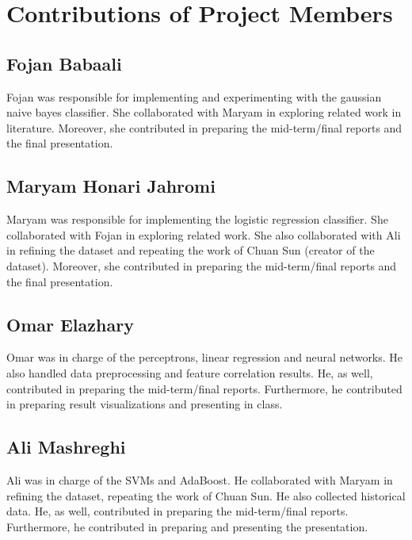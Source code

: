 \documentclass[journal,transmag]{IEEEtran}
\begin{document}
\section{Contributions of Project Members}
\subsection{Fojan Babaali}
Fojan was responsible for implementing and experimenting with the gaussian naive bayes classifier. She collaborated with Maryam in exploring related work in literature. Moreover, she contributed in preparing the mid-term/final reports and the final presentation.

\subsection{Maryam Honari Jahromi}
Maryam was responsible for implementing the logistic regression classifier. She collaborated with Fojan in exploring related work. She also collaborated with Ali in refining the dataset and repeating the work of Chuan Sun (creator of the dataset). Moreover, she contributed in preparing the mid-term/final reports and the final presentation.

\subsection{Omar Elazhary}
Omar was in charge of the perceptrons, linear regression and neural networks. He also handled data preprocessing and feature correlation results. He, as well, contributed in preparing the mid-term/final reports. Furthermore, he contributed in preparing result visualizations and presenting in class.

\subsection{Ali Mashreghi}
Ali was in charge of the SVMs and AdaBoost. He collaborated with Maryam in refining the dataset, repeating the work of Chuan Sun. He also collected historical data. He, as well, contributed in preparing the mid-term/final reports. Furthermore, he contributed in preparing and presenting the presentation.	
	
\end{document}
